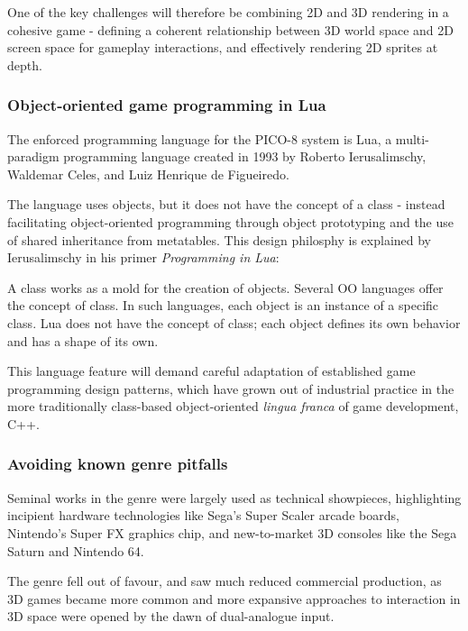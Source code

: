 \documentclass{article}
\begin{document}
One of the key challenges will therefore be combining 2D and 3D rendering in a cohesive game - 
defining a coherent relationship between 3D world space and 2D screen space for
gameplay interactions, and effectively rendering 2D sprites at depth.

\subsubsection*{Object-oriented game programming in Lua}
The enforced programming language for the PICO-8 system is Lua, a multi-paradigm programming
language created in 1993 by Roberto Ierusalimschy, Waldemar Celes, and Luiz Henrique de Figueiredo.

The language uses objects, but it does not have the concept of a class - instead facilitating
object-oriented programming through object prototyping and the use of shared inheritance
from metatables.\cite{ierusalimschy} This design philosphy is explained by Ierusalimschy in his
primer \textit{Programming in Lua}:

\begin{displayquote}
A class works as a mold for the creation of objects. Several OO languages offer the concept of class. In such languages, each object is an instance of a specific class. Lua does not have the concept of class; each object defines its own behavior and has a shape of its own.
\end{displayquote}

This language feature will demand careful adaptation of established game programming design
patterns, which have grown out of industrial practice in the more traditionally class-based
object-oriented \textit{lingua franca} of game development, C++.\cite{nystrom}

\subsubsection*{Avoiding known genre pitfalls}
Seminal works in the genre were largely used as technical showpieces, highlighting incipient
hardware technologies like Sega's Super Scaler arcade boards, Nintendo's Super FX graphics chip, and
new-to-market 3D consoles like the Sega Saturn and Nintendo 64.

The genre fell out of favour, and saw much reduced commercial production, as 3D games became more
common and more expansive approaches to interaction in 3D space were opened by the dawn of
dual-analogue input.
\end{document}
